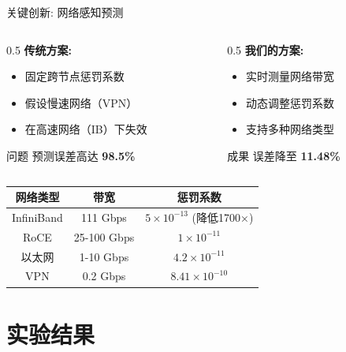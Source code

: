 \documentclass[aspectratio=169,10pt]{beamer}
\begin{document}
\begin{frame}{关键创新: 网络感知预测}
\begin{columns}
\begin{column}{0.5\textwidth}
\textbf{传统方案:}
\begin{itemize}
    \item 固定跨节点惩罚系数
    \item 假设慢速网络（VPN）
    \item 在高速网络（IB）下失效
\end{itemize}
\vspace{0.3cm}
\begin{alertblock}{问题}
预测误差高达 \textbf{98.5\%}
\end{alertblock}
\end{column}
\begin{column}{0.5\textwidth}
\textbf{我们的方案:}
\begin{itemize}
    \item 实时测量网络带宽
    \item 动态调整惩罚系数
    \item 支持多种网络类型
\end{itemize}
\vspace{0.3cm}
\begin{block}{成果}
误差降至 \textbf{11.48\%}
\end{block}
\end{column}
\end{columns}
\vspace{0.5cm}
\begin{center}
\begin{tabular}{ccc}
\toprule
\textbf{网络类型} & \textbf{带宽} & \textbf{惩罚系数} \\
\midrule
InfiniBand & 111 Gbps & $5\times10^{-13}$ (降低1700×) \\
RoCE & 25-100 Gbps & $1\times10^{-11}$ \\
以太网 & 1-10 Gbps & $4.2\times10^{-11}$ \\
VPN & 0.2 Gbps & $8.41\times10^{-10}$ \\
\bottomrule
\end{tabular}
\end{center}
\end{frame}

\section{实验结果}
\end{document}
